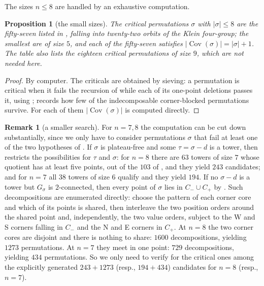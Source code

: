 \documentclass[12pt]{article}
\def\xspace{ }%
\newtheorem{proposition}[proposition]{Proposition}
\theoremstyle{definition}
\newtheorem{remark}[remark]{Remark}
\newcommand{\cb}{corner-blocked\xspace}
\newcommand{\Cov}{\operatorname{Cov}}  %
\newcommand{\Wcr}{W\xspace}    %
\newcommand{\Ncr}{N\xspace}    %
\newcommand{\Scr}{S\xspace}    %
\newcommand{\Ecr}{E\xspace}    %
\newcommand{\core}{corner core\xspace}
\newcommand{\cores}{corner cores\xspace}
\newcommand{\Cm}{C_{-}}
\newcommand{\Cp}{C_{+}}
\newcommand{\igr}{G}                      %
\begin{document}
The sizes $n \le 8$ are handled by an exhaustive computation.

\begin{proposition}[the small sizes]\label{prop:critsmall}
The critical permutations $\sigma$ with $|\sigma| \le 8$ are the
fifty-seven listed in , falling into twenty-two orbits
of the Klein four-group; the smallest are of size $5$, and each of the fifty-seven
satisfies $|\Cov(\sigma)| = |\sigma| + 1$. The table also lists the
eighteen critical permutations of size $9$, which are not needed here.
\end{proposition}

\begin{proof}
By computer. The criticals are obtained by sieving: a permutation is
critical when it fails the recursion of  while each of its
one-point deletions passes it, using ;
 records how few of the indecomposable \cb permutations
survive. For each of them $|\Cov(\sigma)|$ is computed directly.
\end{proof}

\begin{remark}[a smaller search]\label{rem:smallsearch}
For $n = 7,8$ the computation can be cut down substantially,
since we only have to consider permutations $\sigma$ that fail at least one of the
two hypotheses of . If $\sigma$ is plateau-free and some $\tau=\sigma - d$ is a tower, then
 restricts the possibilities for $\tau$ and $\sigma$: for $n = 8$ there are $63$
towers of size $7$ whose quotient has at least five points, out of the $103$ of
, and they yield $243$ candidates; and for
$n = 7$ all $38$ towers of size $6$ qualify and they yield $194$. If
no $\sigma - d$ is a tower but $\igr_\sigma$ is $2$-connected, then every point of $\sigma$ lies in $\Cm \cup \Cp$ by
. Such decompositions are
enumerated directly: choose the pattern of each \core and which of its
points is shared, then interleave the two position orders around the
shared point and, independently, the two value orders, subject to the
\Wcr and \Scr corners falling in $\Cm$ and the \Ncr and \Ecr corners in
$\Cp$. At $n = 8$ the two \cores are disjoint and there is nothing to
share: $1600$ decompositions, yielding $1273$ permutations. At $n = 7$
they meet in one point: $729$ decompositions, yielding $434$
permutations.
So we only need to verify  for the critical ones among the explicitly generated
$243+1273$ (resp., $194+434$) candidates for $n=8$ (resp., $n=7$).
\end{remark}
\end{document}
